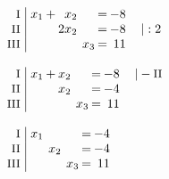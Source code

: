 \begin{equation*}
\begin{array}{l}
\\ \\
\setlength{\arraycolsep}{1pt}
\begin{array}{r|rcrcrcrl}
    \text{\small I } &\; x_{1} & + &  x_{2} &  &       & = & -8 &          \\
   \text{\small II } &\;       &   & 2x_{2} &  &       & = & -8 & \quad|:2 \\
  \text{\small III } &\;       &   &        &  & x_{3} & = & 11 &            
\end{array}
\\ \\
\setlength{\arraycolsep}{1pt}
\begin{array}{r|rcrcrcrl}
    \text{\small I } &\; x_{1} & + & x_{2} &  &       & = & -8 & \quad|-\text{\small II} \\
   \text{\small II } &\;       &   & x_{2} &  &       & = & -4 &                         \\
  \text{\small III } &\;       &   &       &  & x_{3} & = & 11 &                           
\end{array}
\\ \\
\setlength{\arraycolsep}{1pt}
\begin{array}{r|rcrcrcrl}
    \text{\small I } &\; x_{1} &  &       &  &       & = & -4 & \\
   \text{\small II } &\;       &  & x_{2} &  &       & = & -4 & \\
  \text{\small III } &\;       &  &       &  & x_{3} & = & 11 &   
\end{array}
\end{array}
\end{equation*}

